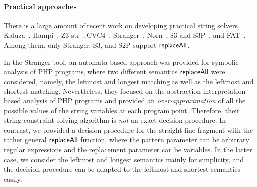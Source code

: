 \paragraph{Practical approaches}

There is a large amount of recent work on developing practical string solvers, Kaluza~\cite{Berkeley-JavaScript}, Hampi~\cite{HAMPI}, Z3-str~\cite{z3-str}, CVC4~\cite{cvc4}, Stranger~\cite{YABI14}, Norn~\cite{Abdulla14}, S3 and S3P~\cite{S3,TCJ16}, and FAT~\cite{Abdulla17}.
Among them, only Stranger, S3, and S2P support $\mathsf{replaceAll}$.  





In the Stranger tool, %
an automata-based approach was provided for symbolic analysis of PHP programs, where two different semantics $\mathsf{replaceAll}$ were considered, namely, the leftmost and longest matching as well as the leftmost and shortest matching. Nevertheless, they focused on the abstraction-interpretation based analysis of PHP programs and provided an \emph{over-approximation} of all the possible values of the string variables at each program point. Therefore, their string constraint solving algorithm is \emph{not} an exact decision procedure. In contrast, we provided a decision procedure for the straight-line fragment with the rather general $\mathsf{replaceAll}$ function, where the pattern parameter can be arbitrary regular expressions and the replacement parameter can be variables. In the latter case,  we consider the leftmost and longest semantics mainly for simplicity, and the decision procedure can be adapted to the leftmost and shortest semantics easily.

